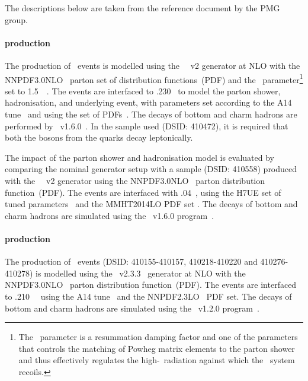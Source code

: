 The descriptions below are taken from the reference document by the
PMG group. 

\paragraph{\ttbar production} 
The production of \ttbar\ events is modelled using the
\powhegbox~\cite{Frixione:2007nw,Nason:2004rx,Frixione:2007vw,Alioli:2010xd}~v2
generator at NLO with the NNPDF3.0NLO~\cite{Ball:2014uwa} parton set
of distribution functions~(PDF) and the \hdamp\ parameter\footnote{The
	\hdamp\ parameter is a resummation damping factor and one of the
	parameters that controls the matching of Powheg matrix elements to
	the parton shower and thus effectively regulates the
	high-\pt\ radiation against which the \ttbar\ system recoils.} set
to 1.5~\mtop~\cite{ATL-PHYS-PUB-2016-020}.  The events are interfaced
to \pythia.230~\cite{Sjostrand:2014zea} to model the parton shower,
hadronisation, and underlying event, with parameters set according
to the A14 tune~\cite{ATL-PHYS-PUB-2014-021} and using the \nnpdftwo
set of PDFs~\cite{Ball:2012cx}. The decays of bottom and charm hadrons
are performed by \evtgen~v1.6.0~\cite{EvtGen}.
In the sample used (DSID\@: 410472), it is required that both the \PW bosons from the \Pqt quarks decay leptonically.

The impact of the parton shower and hadronisation model is evaluated
by comparing the nominal generator setup with a sample (DSID\@: 410558) produced with
the
\powhegbox~\cite{Frixione:2007nw,Nason:2004rx,Frixione:2007vw,Alioli:2010xd}~v2
generator using the NNPDF3.0NLO~\cite{Ball:2014uwa} parton
distribution function~(PDF). The events are interfaced with
\herwigseven.04~\cite{Bahr:2008pv,Bellm:2015jjp}, using the H7UE set
of tuned parameters~\cite{Bellm:2015jjp} and the MMHT2014LO PDF set
\cite{Harland-Lang:2014zoa}.
The decays of bottom and charm hadrons
are simulated using the \evtgen\ v1.6.0 program~\cite{EvtGen}. 

\paragraph{\ttV production} 
The production of \ttV\ events (DSID\@: 410155-410157, 410218-410220
and 410276-410278) is modelled using the
\mgamc~v2.3.3~\cite{Alwall:2014hca} generator at NLO with the
NNPDF3.0NLO~\cite{Ball:2014uwa} parton distribution function~(PDF).
The events are interfaced to \pythia.210~\cite{Sjostrand:2014zea}~
using the A14 tune~\cite{ATL-PHYS-PUB-2014-021} and the
NNPDF2.3LO~\cite{Ball:2014uwa} PDF set. The decays of bottom and charm
hadrons are simulated using the \evtgen\ v1.2.0 program~\cite{EvtGen}.


